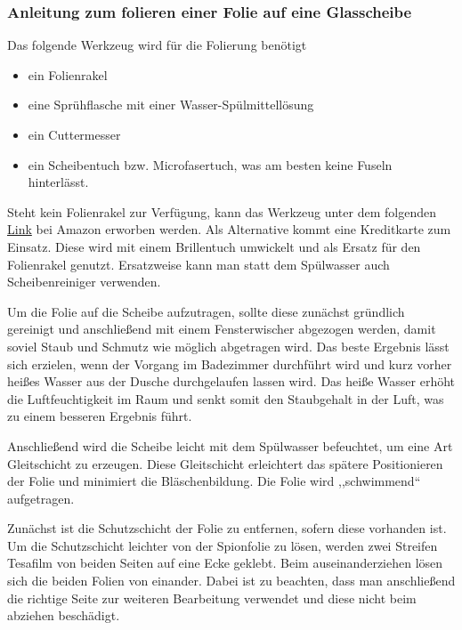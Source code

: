 \subsubsection{Anleitung zum folieren einer Folie auf eine Glasscheibe}
Das folgende Werkzeug wird für die Folierung benötigt
\begin{center}
	\begin{singlespace}
		\begin{itemize}
			\item ein Folienrakel
			\item eine Sprühflasche mit einer Wasser-Spülmittellösung
			\item ein Cuttermesser
			\item ein Scheibentuch bzw. Microfasertuch, was am besten keine Fuseln hinterlässt.
		\end{itemize}
	\end{singlespace}
\end{center}
Steht kein Folienrakel zur Verfügung, kann das Werkzeug unter dem folgenden \href{https://www.amazon.de/Folienrakel-Filzkante-Filzrakel-Kunststoffrakel-Verkleberakel/dp/B073S7KT25/ref=sr_1_2?ie=UTF8&qid=1503417838&sr=8-2&keywords=werkzeug+folierung}{Link} bei Amazon erworben werden. Als Alternative kommt eine Kreditkarte zum Einsatz. Diese wird mit einem Brillentuch umwickelt und als Ersatz für den Folienrakel genutzt. Ersatzweise kann man statt dem Spülwasser auch Scheibenreiniger verwenden.

Um die Folie auf die Scheibe aufzutragen, sollte diese zunächst gründlich gereinigt und anschließend mit einem Fensterwischer abgezogen werden, damit soviel Staub und Schmutz wie möglich abgetragen wird. Das beste Ergebnis lässt sich erzielen, wenn der Vorgang im Badezimmer durchführt wird und kurz vorher heißes Wasser aus der Dusche durchgelaufen lassen wird. Das heiße Wasser erhöht die Luftfeuchtigkeit im Raum und senkt somit den Staubgehalt in der Luft, was zu einem besseren Ergebnis führt.

Anschließend wird die Scheibe leicht mit dem Spülwasser befeuchtet, um eine Art Gleitschicht zu erzeugen. Diese Gleitschicht erleichtert das spätere Positionieren der Folie und minimiert die Bläschenbildung. Die Folie wird ,,schwimmend`` aufgetragen.

Zunächst ist die Schutzschicht der Folie zu entfernen, sofern diese vorhanden ist. Um die Schutzschicht leichter von der Spionfolie zu lösen, werden zwei Streifen Tesafilm von beiden Seiten auf eine Ecke geklebt. Beim auseinanderziehen lösen sich die beiden Folien von einander. Dabei ist zu beachten, dass man anschließend die richtige Seite zur weiteren Bearbeitung verwendet und diese nicht beim abziehen beschädigt.

